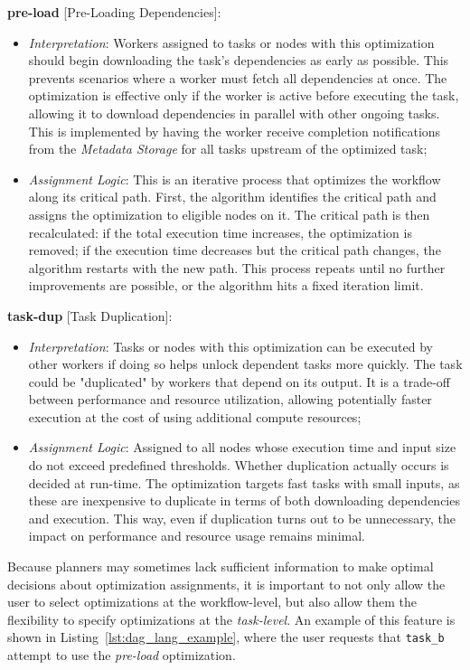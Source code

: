 \documentclass[conference]{IEEEtran}
\begin{document}
\textbf{pre-load} [Pre-Loading Dependencies]:
\begin{itemize}
  \item \textit{Interpretation}: Workers assigned to tasks or nodes with this optimization should begin downloading the task's dependencies as early as possible. This prevents scenarios where a worker must fetch all dependencies at once. The optimization is effective only if the worker is active before executing the task, allowing it to download dependencies in parallel with other ongoing tasks. This is implemented by having the worker receive completion notifications from the \textit{Metadata Storage} for all tasks upstream of the optimized task;
  \item \textit{Assignment Logic}: This is an iterative process that optimizes the workflow along its critical path. First, the algorithm identifies the critical path and assigns the optimization to eligible nodes on it. The critical path is then recalculated: if the total execution time increases, the optimization is removed; if the execution time decreases but the critical path changes, the algorithm restarts with the new path. This process repeats until no further improvements are possible, or the algorithm hits a fixed iteration limit.
\end{itemize}

\textbf{task-dup} [Task Duplication]:
\begin{itemize}
  \item \textit{Interpretation}: Tasks or nodes with this optimization can be executed by other workers if doing so helps unlock dependent tasks more quickly. The task could be "duplicated" by workers that depend on its output. It is a trade-off between performance and resource utilization, allowing potentially faster execution at the cost of using additional compute resources;
  \item \textit{Assignment Logic}: Assigned to all nodes whose execution time and input size do not exceed predefined thresholds. Whether duplication actually occurs is decided at run-time. The optimization targets fast tasks with small inputs, as these are inexpensive to duplicate in terms of both downloading dependencies and execution. This way, even if duplication turns out to be unnecessary, the impact on performance and resource usage remains minimal.
\end{itemize}

Because planners may sometimes lack sufficient information to make optimal decisions about optimization assignments, it is important to not only allow the user to select optimizations at the workflow-level, but also allow them the flexibility to specify optimizations at the \textit{task-level}. An example of this feature is shown in Listing~\ref{lst:dag_lang_example}, where the user requests that \texttt{task\_b} attempt to use the \textit{pre-load} optimization.
\end{document}

